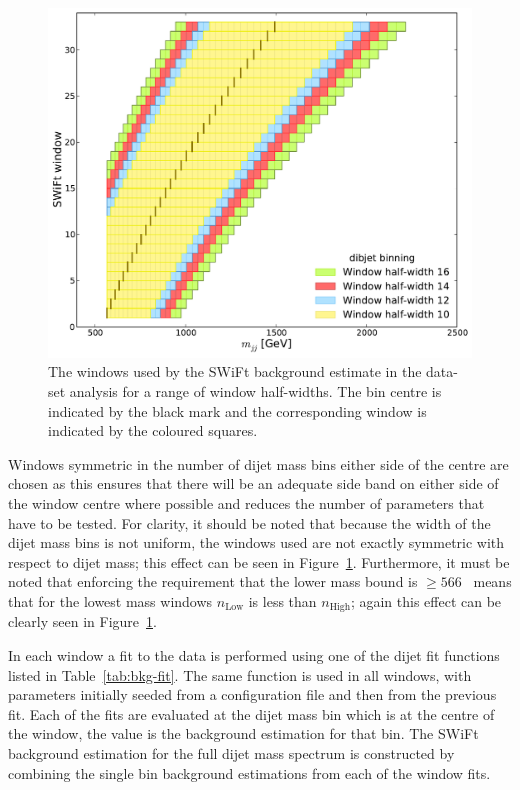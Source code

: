 \vspace{-1em}
\begin{figure}[!htb]
\centering
\includegraphics[width=0.75\linewidth, angle=0]{figs/Dibjet/LowMass/evt-swiftBins_min566_fl0_fh0_tr0.pdf}
\vspace{-0.5em}
\caption[The windows used by the SWiFt background estimate in the \lm{} data-set analysis for a range of window half-widths.]
        {\label{fig:bkg-lm_swiftBins}
  The windows used by the SWiFt background estimate in the \lm{} data-set analysis for a range of window half-widths.
  The bin centre is indicated by the black mark and the corresponding window is indicated by the coloured squares.}
\end{figure}

Windows symmetric in the number of dijet mass bins either side of the centre are chosen
as this ensures that there will be an adequate side band on either side of the window centre where possible
and reduces the number of parameters that have to be tested.
For clarity, it should be noted that because the width of the dijet mass bins is not uniform, the windows used are not exactly symmetric with respect to dijet mass;
this effect can be seen in Figure~\ref{fig:bkg-lm_swiftBins}.
Furthermore, it must be noted that enforcing the requirement that the lower mass bound is $\geq566$~\GeV{}
means that for the lowest mass windows $n_{\text{Low}}$ is less than $n_{\text{High}}$;
again this effect can be clearly seen in Figure~\ref{fig:bkg-lm_swiftBins}.

In each window a fit to the data is performed using one of the dijet fit functions listed in Table~\ref{tab:bkg-fit}.
The same function is used in all windows, with parameters initially seeded from a configuration file and then from the previous fit.
Each of the fits are evaluated at the dijet mass bin which is at the centre of the window, the value is the background estimation for that bin.
The SWiFt background estimation for the full dijet mass spectrum is constructed by combining the single bin background estimations from each of the window fits.

